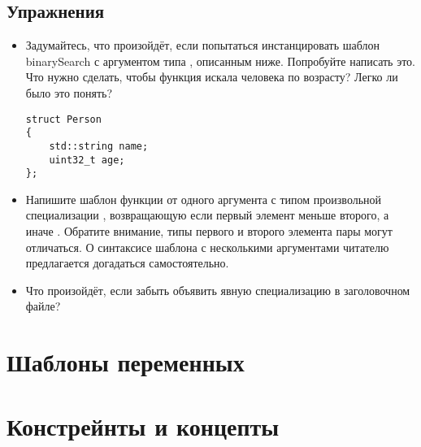 \subsection*{Упражнения}
\begin{itemize}
\item Задумайтесь, что произойдёт, если попытаться инстанцировать шаблон binarySearch с аргументом типа , описанным ниже. Попробуйте написать это. Что нужно сделать, чтобы функция искала человека по возрасту? Легко ли было это понять?
\begin{verbatim}
struct Person
{
    std::string name;
    uint32_t age;
};
\end{verbatim}
\item Напишите шаблон функции  от одного аргумента с типом произвольной специализации , возвращающую  если первый элемент меньше второго, а иначе . Обратите внимание, типы первого и второго элемента пары могут отличаться. О синтаксисе шаблона с несколькими аргументами читателю предлагается догадаться самостоятельно.
\item Что произойдёт, если забыть объявить явную специализацию в заголовочном файле?
\end{itemize}

\section{Шаблоны переменных}


\section{Констрейнты и концепты}



